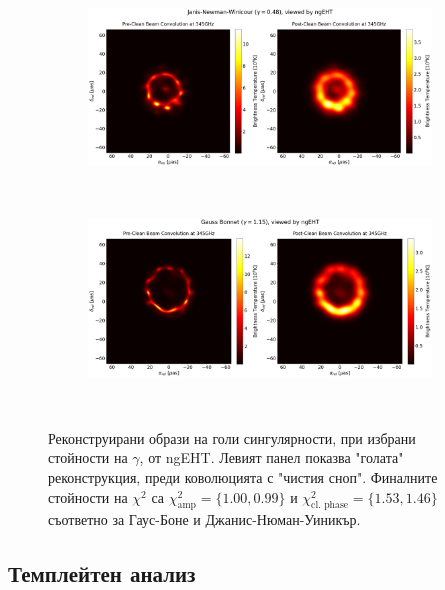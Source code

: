 \begin{figure}[h!]
	\centering
	\begin{subfigure}{12cm}
		\hspace{-1.5cm}
		\includegraphics[scale = 0.23]{Ehtim_plot_ngEHT_no_blur_345_JNW.png}
	\end{subfigure}\\
	\begin{subfigure}{12cm}
		\hspace{-1.5cm}
		\includegraphics[scale = 0.23]{Ehtim_plot_ngEHT_no_blur_345_GB.png}
	\end{subfigure}\\
	\label{Naked_Singularity_EHT_ng2017}
	\caption[Реконструирани образи на голи сингулярности, при избрани стойности на $\gamma$, от ngEHT]{Реконструирани образи на голи сингулярности, при избрани стойности на $\gamma$, от ngEHT. Левият панел показва "голата"$\,$ реконструкция, преди коволюцията с "чистия сноп". Финалните стойности на $\chi^2$ са $\chi^2_\text{amp} = \{1.00, 0.99\}$ и $\chi^2_\text{cl. phase} = \{1.53, 1.46\}$ съответно за Гаус-Боне и Джанис-Нюман-Уиникър.} 
\end{figure}

\subsection{Темплейтен анализ}

